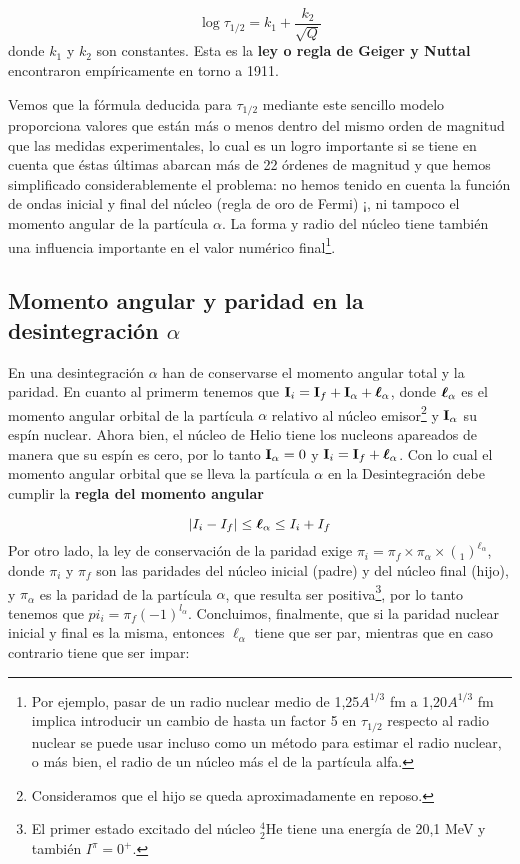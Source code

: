 \begin{equation}
    \log \tau_{1/2} = k_1 + \frac{k_2}{\sqrt{Q}}
\end{equation}
donde $k_1$ y $k_2$ son constantes. Esta es la \textbf{ley o regla de Geiger y Nuttal} encontraron empíricamente en torno a 1911. %

Vemos que la fórmula deducida para $\tau_{1/2}$ mediante este sencillo modelo proporciona valores que están más o menos dentro del mismo orden de magnitud que las medidas experimentales, lo cual es un logro importante si se tiene en cuenta que éstas últimas abarcan más de 22 órdenes de magnitud y que hemos simplificado considerablemente el problema: no hemos tenido en cuenta la función de ondas inicial y final del núcleo (regla de oro de Fermi) ¡, ni tampoco el momento angular de la partícula $\alpha$. La forma y radio del núcleo tiene también una influencia importante en el valor numérico final\footnote{Por ejemplo, pasar de un radio nuclear medio de 1,25$A^{1/3}$ fm a 1,20$A^{1/3}$ fm implica introducir un cambio de hasta un factor 5 en $\tau_{1/2}$ respecto al radio nuclear se puede usar incluso como un método para estimar el radio nuclear, o más bien, el radio de un núcleo más el de la partícula alfa.}.


\subsection{Momento angular y paridad en la desintegración $\alpha$}

En una desintegración $\alpha$ han de conservarse el momento angular total y la paridad. En cuanto al primerm tenemos que $\mathbf{I}_i = \mathbf{I}_f + \mathbf{I}_\alpha + \boldsymbol{\ell}_\alpha$, donde $\boldsymbol{\ell}_\alpha$ es el momento angular orbital de la partícula $\alpha$ relativo al núcleo emisor\footnote{Consideramos que el hijo se queda aproximadamente en reposo.} y $\mathbf{I}_\alpha$ su espín nuclear. Ahora bien, el núcleo de Helio tiene los nucleons apareados de manera que su espín es cero, por lo tanto $\mathbf{I}_\alpha  =0$ y $\mathbf{I}_i = \mathbf{I}_f + \boldsymbol{\ell}_\alpha$. Con lo cual el momento angular orbital que se lleva la partícula $\alpha$ en la Desintegración debe cumplir la \textbf{regla del momento angular}

\begin{equation}
    |I_i-I_f|\leq \boldsymbol{\ell}_\alpha \leq I_i + I_f
\end{equation}
Por otro lado, la ley de conservación de la paridad exige $\pi_i=\pi_f \times \pi_\alpha \times (_1)^{\ell_\alpha}$, donde $\pi_i$ y $\pi_f$ son las paridades del núcleo inicial (padre) y del núcleo final (hijo), y $\pi_\alpha$ es la paridad de la partícula $\alpha$, que resulta ser positiva\footnote{El primer estado excitado del núcleo $^4_2$He tiene una energía de 20,1 MeV y también $I^\pi = 0^+$.}, por lo tanto tenemos que $pi_i = \pi_f (-1)^{l_\alpha}$. Concluimos, finalmente, que si la paridad nuclear inicial y final es la misma, entonces $\ell_\alpha$ tiene que ser par, mientras que en caso contrario tiene que ser impar:

